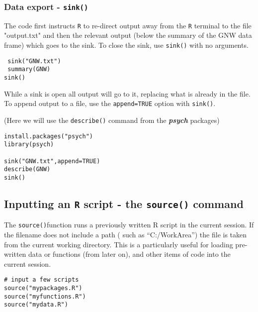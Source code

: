 \documentclass[a4paper,12pt]{article}
\begin{document}
\subsubsection{Data export - \texttt{sink()}}


The code first instructs \texttt{R} to re-direct output away from the \texttt{R} terminal to the file "output.txt" and
then the relevant output  (below the summary of the GNW data frame) which goes to the sink.
To close the sink, use
\texttt{sink()} with no arguments.

\begin{framed}
\begin{verbatim}
 sink("GNW.txt")
 summary(GNW)
sink()
\end{verbatim}
\end{framed}


While a sink is open all output will go to it, replacing what is already in the file. To append output
to a file, use the \texttt{append=TRUE} option with \texttt{sink()}. 

(Here we will use the \texttt{describe()} command from the \textbf{\textit{psych}} packages)

\begin{framed}
\begin{verbatim}
install.packages("psych")
library(psych)
 
sink("GNW.txt",append=TRUE)
describe(GNW)
sink()
\end{verbatim}
\end{framed}

\subsection{Inputting an \texttt{R} script - the \texttt{source()} command}
The \texttt{source()}function runs a previously written R script in the current session. If the filename does not include a path ( such as “C:/WorkArea”) the file is taken from the current working directory. This is a particularly useful for loading pre-written data or functions  (from  later on), and other items of code into the current session.

\begin{verbatim}
# input a few scripts
source("mypackages.R")
source("myfunctions.R")
source("mydata.R")
\end{verbatim}
\end{document}
